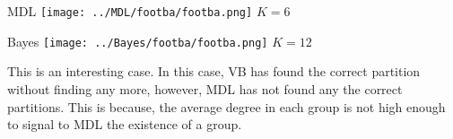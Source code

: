 \begin{minipage}{0.45\linewidth}
MDL
\centering
\texttt{[image: ../MDL/footba/footba.png]}
$K=6$

\end{minipage}
\begin{minipage}{0.45\linewidth}
Bayes
\centering
\texttt{[image: ../Bayes/footba/footba.png]}
$K=12$
\end{minipage}
\vspace{10pt}

This is an interesting case. In this case, VB has found the correct
partition without finding any more, however, MDL has not found any
the correct partitions. This is because, the average degree in each
group is not high enough to signal to MDL the existence of a group.
